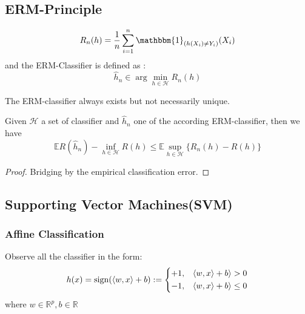 \subsection{ERM-Principle}
\begin{definition}
	\begin{equation*}
		R_n(h) = \frac{1}{n} \sum_{i = 1}^n \mathbbm{1}_{(h(X_i) \neq Y_i)}(X_i)
	\end{equation*}
	and the ERM-Classifier is defined as :
	\begin{equation*}
		\hat{h}_n \in \arg \min_{ h \in \mathcal{H}} R_n(h)
	\end{equation*}
\end{definition}

\begin{remark}
	The ERM-classifier always exists but not necessarily unique.
\end{remark}

\begin{lemma}
Given $\mathcal{H}$ a set of classifier and $\hat{h}_n$ one of the according ERM-classifier, then we have
\begin{equation*}
	\mathbb{E} R(\hat{h}_n) - \inf_{h \in \mathcal{H}} R(h) \leq \mathbb{E} \sup_{h \in \mathcal{H}} \{R_n(h) - R(h) \}
\end{equation*}
\end{lemma}

\label{technique. empirical bridging}
\begin{proof} 
	Bridging by the empirical classification error.
\end{proof}


\subsection{Supporting Vector Machines(SVM)}

\subsubsection*{Affine Classification}
Observe all the classifier in the form:
\begin{equation*}
	h(x) = \operatorname*{sign}( \langle w, x \rangle + b) := 
	\left\{\begin{aligned}
		+1,& \quad \langle w, x \rangle + b \rangle > 0\\
		-1,& \quad \langle w, x \rangle + b \rangle \leq 0
	\end{aligned}\right.
\end{equation*}
where $w \in \mathbb{R}^p, b \in \mathbb{R}$

